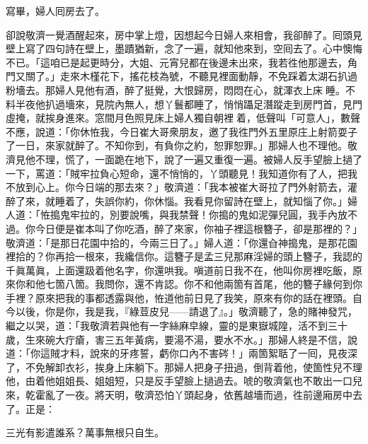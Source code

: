 寫畢，婦人囘房去了。

卻說敬濟一覺酒醒起來，房中掌上燈，因想起今日婦人來相會，我卻醉了。囘頭見壁上寫了四句詩在壁上，墨蹟猶新，念了一遍，就知他來到，空囘去了。心中懊悔不已。「這咱已是起更時分，大姐、元宵兒都在後邊未出來，我若徃他那邊去，角門又關了。」走來木槿花下，搖花枝為號，不聽見裡面動靜，不免踩着太湖石扒過粉墻去。那婦人見他有酒，醉了挺覺，大恨歸房，悶悶在心，就渾衣上床𢱉睡。不料半夜他扒過墻來，見院內無人，想丫鬟都睡了，悄悄躡足潛蹤走到房門首，見門虛掩，就挨身進來。窓間月色照見床上婦人獨自朝裡𢱉着，低聲叫「可意人」，數聲不應，說道：「你休恠我，今日崔大哥衆朋友，邀了我徃門外五里原庄上射箭耍子了一日，來家就醉了。不知你到，有負你之約，恕罪恕罪。」那婦人也不理他。敬濟見他不理，慌了，一面跪在地下，說了一遍又重復一遍。{}被婦人反手望臉上撾了一下，罵道：「賊牢拉負心短命，還不悄悄的，丫頭聽見！我知道你有了人，把我不放到心上。你今日端的那去來？」敬濟道：「我本被崔大哥拉了門外射箭去，灌醉了來，就睡着了，失誤你約，你休惱。我看見你留詩在壁上，就知惱了你。」婦人道：「恠搗鬼牢拉的，別要說嘴，與我禁聲！你搗的鬼如泥彈兒圓，我手內放不過。你今日便是崔本叫了你吃酒，醉了來家，你袖子裡這根簪子，卻是那裡的？」敬濟道：「是那日花園中拾的，今兩三日了。」婦人道：「你還㒲神搗鬼，是那花園裡拾的？你再拾一根來，我纔信你。{}這簪子是孟三兒那麻淫婦的頭上簪子，{}我認的千眞萬眞，上面還趿着他名字，你還哄我。嗔道前日我不在，他叫你房裡吃飯，原來你和他七箇八箇。我問你，還不肯認。你不和他兩箇有首尾，他的簪子緣何到你手裡？原來把我的事都透露與他，恠道他前日見了我笑，{}原來有你的話在裡頭。自今以後，你是你，我是我，『綠荳皮兒——請退了』。」敬濟聽了，急的賭神發咒，繼之以哭，{}道：「我敬濟若與他有一字絲麻皁線，靈的是東嶽城隍，活不到三十歲，生來碗大疔瘡，害三五年黃病，要湯不湯，要水不水。」{}那婦人終是不信，說道：「你這賊才料，說來的牙疼誓，虧你口內不害硶！」兩箇絮聒了一囘，見夜深了，不免解卸衣衫，挨身上床躺下。那婦人把身子扭過，倒背着他，使箇性兒不理他，由着他姐姐長、姐姐短，只是反手望臉上撾過去。{}唬的敬濟氣也不敢出一口兒來，乾霍亂了一夜。將天明，敬濟恐怕丫頭起身，依舊越墻而過，徃前邊廂房中去了。正是：

\begin{myquote}
三光有影遣誰系？萬事無根只自生。
\end{myquote}

